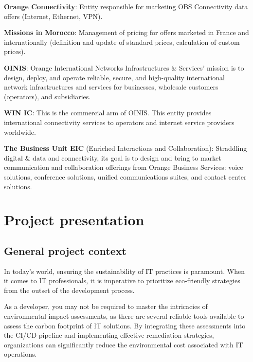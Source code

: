   \textbf{Orange Connectivity}: Entity responsible for marketing OBS Connectivity data offers (Internet, Ethernet, VPN).
  
  \vspace{10pt} 

  \textbf{Missions in Morocco}: Management of pricing for offers marketed in France and internationally (definition and update of standard prices, calculation of custom prices).
  
  \vspace{10pt} 

  \textbf{OINIS}: Orange International Networks Infrastructures \& Services' mission is to design, deploy, and operate reliable, secure, and high-quality international network infrastructures and services for businesses, wholesale customers (operators), and subsidiaries.

  \vspace{10pt} 

  \textbf{WIN IC}: This is the commercial arm of OINIS. This entity provides international connectivity services to operators and internet service providers worldwide.

  \vspace{10pt} 
  
  \textbf{The Business Unit EIC} (Enriched Interactions and Collaboration): Straddling digital \& data and connectivity, its goal is to design and bring to market communication and collaboration offerings from Orange Business Services: voice solutions, conference solutions, unified communications suites, and contact center solutions.

\section{Project presentation}
\subsection{General project context}
In today's world, ensuring the sustainability of IT practices is paramount. When it comes to IT professionals, it is imperative to prioritize eco-friendly strategies from the outset of the development process.

As a developer, you may not be required to master the intricacies of environmental impact assessments, as there are several reliable tools available to assess the carbon footprint of IT solutions. By integrating these assessments into the CI/CD pipeline and implementing effective remediation strategies, organizations can significantly reduce the environmental cost associated with IT operations.

